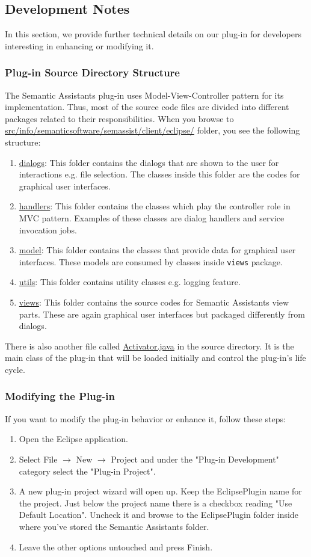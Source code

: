 \subsection{Development Notes}
\label{subsec:eclipse.development}
In this section, we provide further technical details on our plug-in for
developers interesting in enhancing or modifying it.

\subsubsection{Plug-in Source Directory Structure}
The Semantic Assistants plug-in uses Model-View-Controller pattern for its
implementation. Thus, most of the source code files are divided into different
packages related to their responsibilities. When you browse to
\url{src/info/semanticsoftware/semassist/client/eclipse/} folder, you see the
following structure:
\begin{enumerate}
\item\url{dialogs}: This folder contains the dialogs that are shown to the user
for interactions e.g. file selection. The classes inside this folder are the
codes for graphical user interfaces.
\item\url{handlers}: This folder contains the classes which play the controller
role in MVC pattern. Examples of these classes are dialog handlers and service
invocation jobs.
\item\url{model}: This folder contains the classes that provide data for
graphical user interfaces. These models are consumed by classes inside
\texttt{views} package.
\item\url{utils}: This folder contains utility classes e.g. logging feature.
\item\url{views}: This folder contains the source codes for Semantic Assistants
view parts. These are again graphical user interfaces but packaged differently
from dialogs.
\end{enumerate}

There is also another file called \url{Activator.java} in the source directory.
It is the main class of the plug-in that will be loaded initially and control
the plug-in's life cycle.

\subsubsection{Modifying the Plug-in}
If you want to modify the plug-in behavior or enhance it, follow these steps:
\begin{enumerate}
\item Open the Eclipse application.
\item Select File $\rightarrow$ New  $\rightarrow$ Project and under the
"Plug-in Development" category select the "Plug-in Project".
\item A new plug-in project wizard will open up. Keep the EclipsePlugin name for
the project. Just below the project name there is a checkbox reading "Use
Default Location". Uncheck it and browse to the EclipsePlugin folder inside
where you've stored the Semantic Assistants folder.
\item Leave the other options untouched and press Finish.
\end{enumerate}

